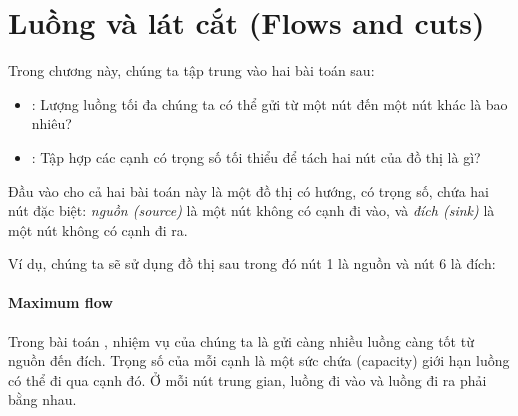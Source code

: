 \chapter{Luồng và lát cắt (Flows and cuts)}

Trong chương này, chúng ta tập trung vào hai
bài toán sau:

\begin{itemize}
\item {}:
Lượng luồng tối đa chúng ta có thể
gửi từ một nút đến một nút khác là bao nhiêu?
\item {}:
Tập hợp các cạnh có trọng số tối thiểu
để tách hai nút của đồ thị là gì?
\end{itemize}

Đầu vào cho cả hai bài toán này là một đồ thị có hướng,
có trọng số, chứa hai nút đặc biệt:
\emph{nguồn (source)} là một nút không có cạnh đi vào,
và \emph{đích (sink)} là một nút không có cạnh đi ra.

Ví dụ, chúng ta sẽ sử dụng đồ thị sau
trong đó nút 1 là nguồn và nút 6
là đích:

\begin{center}
\end{center}

\subsubsection{Maximum flow}


Trong bài toán ,
nhiệm vụ của chúng ta là gửi càng nhiều luồng càng tốt
từ nguồn đến đích.
Trọng số của mỗi cạnh là một sức chứa (capacity)
giới hạn luồng
có thể đi qua cạnh đó.
Ở mỗi nút trung gian,
luồng đi vào và luồng đi ra
phải bằng nhau.

